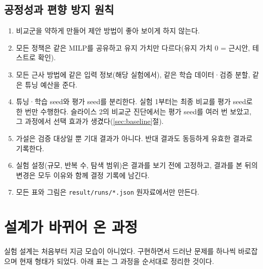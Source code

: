 \documentclass[11pt,a4paper]{article}
\begin{document}
\subsection{공정성과 편향 방지 원칙}

\begin{enumerate}[leftmargin=1.5em]
  \item 비교군을 약하게 만들어 제안 방법이 좋아 보이게 하지 않는다.
  \item 모든 정책은 같은 MILP를 공유하고 유지 가치만 다르다(유지 가치 0 = 근시안, 테스트로 확인).
  \item 모든 근사 방법에 같은 입력 정보(해당 실험에서), 같은 학습 데이터·검증 분할, 같은 튜닝 예산을 준다.
  \item 튜닝·학습 seed와 평가 seed를 분리한다. 실험 1부터는 최종 비교를 평가 seed로 한 번만 수행한다.
        슬라이스 2의 비교군 진단에서는 평가 seed를 여러 번 보았고, 그 과정에서 선택 효과가 생겼다(\ref{sec:baseline}절).
  \item 가설은 검증 대상일 뿐 기대 결과가 아니다. 반대 결과도 동등하게 유효한 결과로 기록한다.
  \item 실험 설정(규모, 반복 수, 탐색 범위)은 결과를 보기 전에 고정하고,
        결과를 본 뒤의 변경은 모두 이유와 함께 결정 기록에 남긴다.
  \item 모든 표와 그림은 \texttt{result/runs/*.json} 원자료에서만 만든다.
\end{enumerate}

\section{설계가 바뀌어 온 과정}

실험 설계는 처음부터 지금 모습이 아니었다. 구현하면서 드러난 문제를 하나씩 바로잡으며
현재 형태가 되었다. 아래 표는 그 과정을 순서대로 정리한 것이다.
\end{document}
